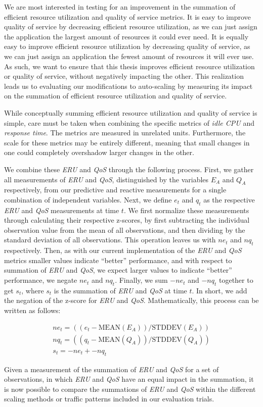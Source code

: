 We are most interested in testing for an improvement in the summation of
efficient resource utilization and quality of service metrics. It is
easy to improve quality of service by decreasing efficient resource
utilization, as we can just assign the application the largest amount of
resources it could ever need. It is equally easy to improve efficient resource
utilization by decreasing quality of service, as we can just assign an
application the fewest amount of resources it will ever use. As such, we want to
ensure that this thesis improves efficient resource utilization or quality of
service, without negatively impacting the other. This realization leads us to
evaluating our modifications to auto-scaling by measuring its impact on the
summation of efficient resource utilization and quality of service.

While conceptually summing efficient resource utilization and quality of service
is simple, care must be taken when combining the specific metrics of
\textit{idle CPU} and \textit{response time}. The metrics are measured in unrelated
units. Furthermore, the scale for these metrics may be entirely different,
meaning that small changes in one could completely overshadow larger changes in
the other.

We combine these \textit{ERU} and \textit{QoS} through the following process.
First, we gather all measurements of \textit{ERU} and \textit{QoS},
distinguished by the variables $E_{A}$ and $Q_{A}$ respectively, from our
predictive and reactive measurements for a single combination of independent
variables. Next, we define $e_{t}$ and $q_{t}$ as the
respective \textit{ERU} and \textit{QoS} measurements at time $t$. We first
normalize these measurements through calculating their respective z-scores,
by first subtracting the individual observation value
from the mean of all observations, and then dividing by the standard deviation of all
observations. This operation leaves us with $ne_{t}$ and $nq_{t}$ respectively.
Then, as with our current implementation of the \textit{ERU} and \textit{QoS}
metrics smaller values indicate ``better'' performance, and with respect to
summation of \textit{ERU} and \textit{QoS}, we expect larger values to indicate
``better'' performance, we negate $ne_{t}$ and $nq_{t}$. Finally, we sum
$-ne_{t}$ and $-nq_{t}$ together to get $s_{t}$, where $s_{t}$ is the summation
of \textit{ERU} and \textit{QoS} at time $t$.
In short, we add the negation of the z-score for
\textit{ERU} and \textit{QoS}. Mathematically, this process can be written as
follows:

\begin{align*}
  ne_{t} = ((e_{t} - \mbox{MEAN}(E_{A})) / \mbox{STDDEV}(E_{A})) \\
  nq_{t} = ((q_{t} - \mbox{MEAN}(Q_{A})) / \mbox{STDDEV}(Q_{A})) \\
  s_{t} = -ne_{t} + -nq_{t}
\end{align*}

Given a measurement of the summation of \textit{ERU} and \textit{QoS} for a set
of observations, in which \textit{ERU} and \textit{QoS} have an equal impact in
the summation, it is now possible to compare the summations of \textit{ERU} and
\textit{QoS} within the different scaling methods or traffic patterns included
in our evaluation trials.
